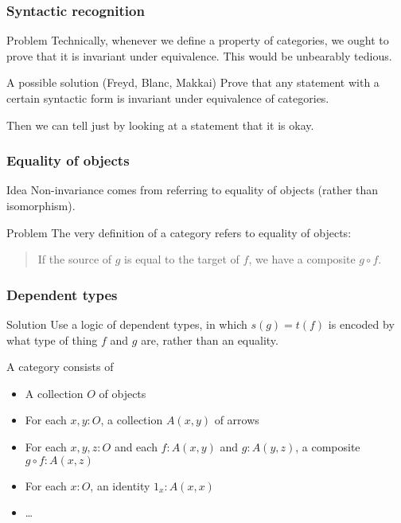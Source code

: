 \documentclass{beamer}
\begin{document}
\begin{frame}
  \frametitle{Syntactic recognition}
  \begin{block}{Problem}
    Technically, whenever we define a property of categories, we ought to prove that it is invariant under equivalence.
    This would be unbearably tedious.
  \end{block}
  \pause
  \begin{block}{A possible solution (Freyd, Blanc, Makkai)}
    Prove that any statement \alert{with a certain syntactic form} is invariant under equivalence of categories.
  \end{block}
  Then we can tell \alert{just by looking} at a statement that it is okay.
\end{frame}

\begin{frame}
  \frametitle{Equality of objects}
  \begin{block}{Idea}
    Non-invariance comes from referring to \alert<1>{equality of objects} (rather than isomorphism).
  \end{block}
  \pause
  \begin{block}{Problem}
    The very \alert{definition} of a category refers to equality of objects:
    \begin{quote}
      If the source of $g$ is \alert{equal to} the target of $f$, we have a composite $g\circ f$.
    \end{quote}
  \end{block}
\end{frame}

\begin{frame}
  \frametitle{Dependent types}
  \begin{block}{Solution}
    Use a logic of \alert{dependent types}, in which $s(g)=t(f)$ is encoded by what \alert{type of thing} $f$ and $g$ are, rather than an equality.
  \end{block}
  A category consists of
  \begin{itemize}
  \item A collection $O$ of objects
  \item For each $x,y:O$, a collection $A(x,y)$ of arrows
  \item For each $x,y,z:O$ and each $f:A(x,y)$ and $g:A(y,z)$, a composite $g\circ f: A(x,z)$
  \item For each $x:O$, an identity $1_x:A(x,x)$
  \item \dots
  \end{itemize}
\end{frame}
\end{document}
